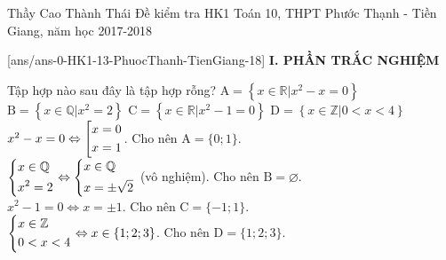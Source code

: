 \begin{name}
{Thầy Cao Thành Thái}
{Đề kiểm tra HK1 Toán 10, THPT Phước Thạnh - Tiền Giang, năm học 2017-2018}
\end{name}
\setcounter{ex}{0}\setcounter{bt}{0}
[ans/ans-0-HK1-13-PhuocThanh-TienGiang-18]
\noindent\textbf{I. PHẦN TRẮC NGHIỆM}
\begin{ex}%
 Tập hợp nào sau đây là tập hợp rỗng?
 \choice
  {$\mathrm{A}= \left\{x \in \mathbb{R} \vert x^2 - x = 0 \right\}$}
  {\True $\mathrm{B}= \left\{x \in \mathbb{Q} \vert x^2 = 2 \right\}$}
  {$\mathrm{C}= \left\{x \in \mathbb{R} \vert x^2 - 1 = 0 \right\}$}
  {$\mathrm{D}= \left\{x \in \mathbb{Z} \vert 0 < x < 4 \right\}$}
 \loigiai
 {
 $x^2 - x = 0 \Leftrightarrow \left[\begin{aligned}& x = 0 \\& x = 1\end{aligned}\right.$. Cho nên $\mathrm{A} = \{0;1\}$.\\
 $\left\{\begin{aligned}& x \in \mathbb{Q} \\& x^2 = 2\end{aligned}\right. \Leftrightarrow \left\{\begin{aligned}& x \in \mathbb{Q} \\& x = \pm \sqrt{2}\end{aligned}\right.$ (vô nghiệm). Cho nên $\mathrm{B} = \varnothing$.\\
 $x^2 - 1 = 0 \Leftrightarrow x = \pm 1$. Cho nên $\mathrm{C} = \{-1;1\}$.\\
 $\left\{\begin{aligned}& x \in \mathbb{Z} \\& 0 < x < 4\end{aligned}\right. \Leftrightarrow x \in \{1;2;3\}$. Cho nên $\mathrm{D} = \{1;2;3\}$.
 }
\end{ex}


